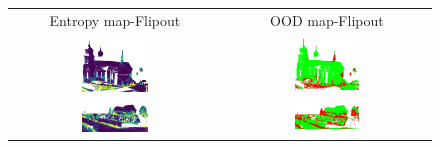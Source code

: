         \begin{figure}[h!]
            \centering
            \begin{tabular}{cc}
                Entropy map-Flipout & OOD map-Flipout \\
                \includegraphics[width=0.33\textwidth, height=0.18\textheight]{images/ood_imgs/fout_sem3d/fout_ent_1.png}& 
                \includegraphics[width=0.33\textwidth, height=0.18\textheight]{images/ood_imgs/fout_sem3d/fout_ent_ood_auroc_1.png}\\

                \includegraphics[width=0.33\textwidth, height=0.18\textheight]{images/ood_imgs/fout_sem3d/fout_ent_2.png}& 
                \includegraphics[width=0.33\textwidth, height=0.18\textheight]{images/ood_imgs/fout_sem3d/fout_ent_ood_auroc_2.png}\\
    

\end{tabular}
\end{figure}

